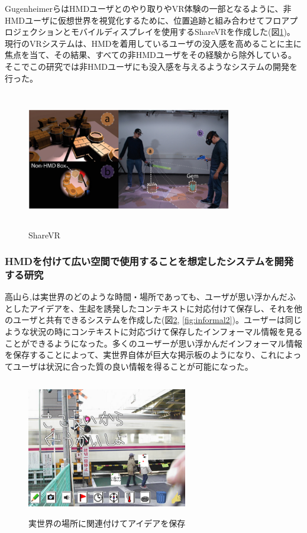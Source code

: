 \documentclass[11pt,a4j, titlepage]{jarticle} %
\begin{document}
Gugenheimerら\cite{Gugenheimer}はHMDユーザとのやり取りやVR体験の一部となるように、非HMDユーザに仮想世界を視覚化するために、位置追跡と組み合わせてフロアプロジェクションとモバイルディスプレイを使用するShareVRを作成した(図\ref{fig:sharevr})。現行のVRシステムは、HMDを着用しているユーザの没入感を高めることに主に焦点を当て、その結果、すべての非HMDユーザをその経験から除外している。そこでこの研究では非HMDユーザにも没入感を与えるようなシステムの開発を行った。

\begin{figure}[H]
  \begin{center}
    \includegraphics[clip,height=6.0cm,width=9.0cm]{./sharevr.eps}
    \caption{ShareVR}
    \label{fig:sharevr}
  \end{center}
\end{figure}

\subsubsection{HMDを付けて広い空間で使用することを想定したシステムを開発する研究}
高山ら\cite{tano},\cite{tano2}は実世界のどのような時間・場所であっても、ユーザが思い浮かんだふとしたアイデアを、生起を誘発したコンテキストに対応付けて保存し、それを他のユーザと共有できるシステムを作成した(図\ref{fig:informal}, \ref{fig:informal2})。ユーザーは同じような状況の時にコンテキストに対応づけて保存したインフォーマル情報を見ることができるようになった。多くのユーザーが思い浮かんだインフォーマル情報を保存することによって、実世界自体が巨大な掲示板のようになり、これによってユーザは状況に合った質の良い情報を得ることが可能になった。

\begin{figure}[H]
  \begin{center}
    \includegraphics[clip,height=6.0cm,width=7.0cm]{./informal.eps}
    \caption{実世界の場所に関連付けてアイデアを保存}
    \label{fig:informal}
  \end{center}
\end{figure}
\end{document}
